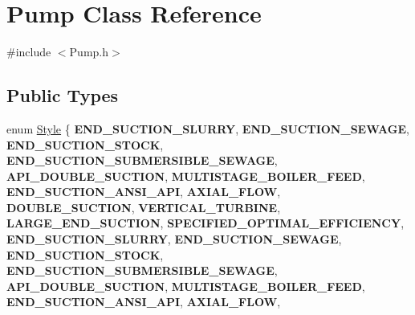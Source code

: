 \hypertarget{class_pump}{}\section{Pump Class Reference}
\label{class_pump}


{\ttfamily \#include $<$Pump.\+h$>$}

\subsection*{Public Types}
\begin{DoxyCompactItemize}
\item 
\mbox{\label{class_pump_aef354601ce4218258cc898b35a1e90ff}} 
enum \hyperlink{class_pump_aef354601ce4218258cc898b35a1e90ff}{Style} \{ \newline
{\bfseries E\+N\+D\+\_\+\+S\+U\+C\+T\+I\+O\+N\+\_\+\+S\+L\+U\+R\+RY}, 
{\bfseries E\+N\+D\+\_\+\+S\+U\+C\+T\+I\+O\+N\+\_\+\+S\+E\+W\+A\+GE}, 
{\bfseries E\+N\+D\+\_\+\+S\+U\+C\+T\+I\+O\+N\+\_\+\+S\+T\+O\+CK}, 
{\bfseries E\+N\+D\+\_\+\+S\+U\+C\+T\+I\+O\+N\+\_\+\+S\+U\+B\+M\+E\+R\+S\+I\+B\+L\+E\+\_\+\+S\+E\+W\+A\+GE}, 
\newline
{\bfseries A\+P\+I\+\_\+\+D\+O\+U\+B\+L\+E\+\_\+\+S\+U\+C\+T\+I\+ON}, 
{\bfseries M\+U\+L\+T\+I\+S\+T\+A\+G\+E\+\_\+\+B\+O\+I\+L\+E\+R\+\_\+\+F\+E\+ED}, 
{\bfseries E\+N\+D\+\_\+\+S\+U\+C\+T\+I\+O\+N\+\_\+\+A\+N\+S\+I\+\_\+\+A\+PI}, 
{\bfseries A\+X\+I\+A\+L\+\_\+\+F\+L\+OW}, 
\newline
{\bfseries D\+O\+U\+B\+L\+E\+\_\+\+S\+U\+C\+T\+I\+ON}, 
{\bfseries V\+E\+R\+T\+I\+C\+A\+L\+\_\+\+T\+U\+R\+B\+I\+NE}, 
{\bfseries L\+A\+R\+G\+E\+\_\+\+E\+N\+D\+\_\+\+S\+U\+C\+T\+I\+ON}, 
{\bfseries S\+P\+E\+C\+I\+F\+I\+E\+D\+\_\+\+O\+P\+T\+I\+M\+A\+L\+\_\+\+E\+F\+F\+I\+C\+I\+E\+N\+CY}, 
\newline
{\bfseries E\+N\+D\+\_\+\+S\+U\+C\+T\+I\+O\+N\+\_\+\+S\+L\+U\+R\+RY}, 
{\bfseries E\+N\+D\+\_\+\+S\+U\+C\+T\+I\+O\+N\+\_\+\+S\+E\+W\+A\+GE}, 
{\bfseries E\+N\+D\+\_\+\+S\+U\+C\+T\+I\+O\+N\+\_\+\+S\+T\+O\+CK}, 
{\bfseries E\+N\+D\+\_\+\+S\+U\+C\+T\+I\+O\+N\+\_\+\+S\+U\+B\+M\+E\+R\+S\+I\+B\+L\+E\+\_\+\+S\+E\+W\+A\+GE}, 
\newline
{\bfseries A\+P\+I\+\_\+\+D\+O\+U\+B\+L\+E\+\_\+\+S\+U\+C\+T\+I\+ON}, 
{\bfseries M\+U\+L\+T\+I\+S\+T\+A\+G\+E\+\_\+\+B\+O\+I\+L\+E\+R\+\_\+\+F\+E\+ED}, 
{\bfseries E\+N\+D\+\_\+\+S\+U\+C\+T\+I\+O\+N\+\_\+\+A\+N\+S\+I\+\_\+\+A\+PI}, 
{\bfseries A\+X\+I\+A\+L\+\_\+\+F\+L\+OW}, 
\newline

\end{DoxyCompactItemize}
